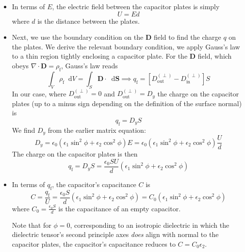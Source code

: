 \documentclass[11pt, a4paper]{article}
\newcommand{\diff}{\mathop{}\!\mathrm{d}} %
\renewcommand{\vec}[1]{\bm{#1}} %
\newcommand{\D}{\vec{D}}  %
\newcommand{\e}{\epsilon}
\newcommand{\ee}{\epsilon_{0}}  %
\renewcommand{\div}{\nabla \cdot}
\begin{document}
\begin{itemize}
	\item In terms of $ E $, the electric field between the capacitor plates is simply
	\begin{equation*}
		U = Ed
	\end{equation*}
	where $ d $ is the distance between the plates. 
			
	\item Next, we use the boundary condition on the $ \D $ field to find the charge $ q $ on the plates. We derive the relevant boundary condition, we apply Gauss's law to a thin region tightly enclosing a capacitor plate. For the $ \D $ field, which obeys $ \div \D = \rho_{\text{f}} $, Gauss's law reads
	\begin{equation*}
		\int_{V} \rho_{\text{f}} \diff V = \int_{S} \D \cdot \diff \vec{S} \implies q_{\text{f}} = \left[D_{\text{out}}^{(\perp)} - D_{\text{in}}^{(\perp)} \right] S
	\end{equation*}
	In our case, where $ D_{\text{out}}^{(\perp)} = 0 $ and $ D_{\text{out}}^{(\perp)} = D_{y} $ the charge on the capacitor plates (up to a minus sign depending on the definition of the surface normal) is
	\begin{equation*}
		q_{\text{f}} = D_{y} S
	\end{equation*}	
	We find $ D_{y} $ from the earlier matrix equation:
	\begin{equation*}
		D_{y} = \ee \left( \e_{1} \sin^{2}\phi + \e_{2} \cos^{2}\phi \right) E = \ee \left( \e_{1} \sin^{2}\phi + \e_{2} \cos^{2}\phi \right) \frac{U}{d}
	\end{equation*}
	The charge on the capacitor plates is then
	\begin{equation*}
		q_{\text{f}} = D_{y} S = \frac{\ee SU}{d} \left( \e_{1} \sin^{2}\phi + \e_{2} \cos^{2}\phi \right) 
	\end{equation*}
	
	\item In terms of $ q_{\text{f}} $, the capacitor's capacitance $ C $ is
	\begin{equation*}
		C = \frac{q_{\text{f}}}{U} = \frac{\ee S}{d}\left(\e_{1} \sin^{2}\phi + \e_{2} \cos^{2}\phi\right) = C_{0}\left(\e_{1} \sin^{2}\phi + \e_{2} \cos^{2}\phi\right)
	\end{equation*}
	where $ C_{0} =  \frac{\ee S}{d} $ is the capacitance of an empty capacitor. 
	
	Note that for $ \phi = 0 $, corresponding to an isotropic dielectric in which the dielectric tensor's second principle axes \textit{does} align with normal to the capacitor plates, the capacitor's capacitance reduces to $ C = C_{0}\e_{2} $. 
\end{itemize}
\end{document}
